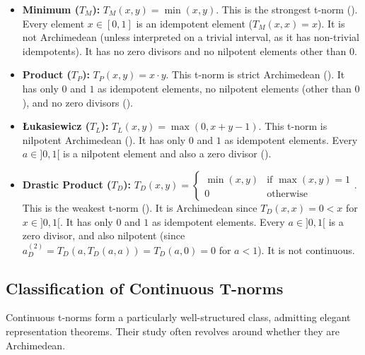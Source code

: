 \begin{example}
  \begin{itemize}
    \item \textbf{Minimum ($T_M$):} $T_M(x, y) = \min(x, y)$.
    This is the strongest t-norm (\cite[Rem.~1.5(i)]{Klement2000}). Every element $x \in [0,1]$ is an idempotent element ($T_M(x,x)=x$). It is not Archimedean (unless interpreted on a trivial interval, as it has non-trivial idempotents). It has no zero divisors and no nilpotent elements other than 0.
    \item \textbf{Product ($T_P$):} $T_P(x, y) = x \cdot y$.
    This t-norm is strict Archimedean (\cite[Ex.~2.14(i)]{Klement2000}). It has only $0$ and $1$ as idempotent elements, no nilpotent elements (other than $0$), and no zero divisors (\cite[Ex.~2.2(i)]{Klement2000}).
    \item \textbf{Łukasiewicz ($T_L$):} $T_L(x, y) = \max(0, x + y - 1)$.
    This t-norm is nilpotent Archimedean (\cite[Ex.~2.14(i)]{Klement2000}). It has only $0$ and $1$ as idempotent elements. Every $a \in ]0,1[$ is a nilpotent element and also a zero divisor (\cite[Ex.~2.2(i)]{Klement2000}).
    \item \textbf{Drastic Product ($T_D$):} $T_D(x, y) = \begin{cases} \min(x,y) & \text{if } \max(x,y)=1 \\ 0 & \text{otherwise} \end{cases}$.
    This is the weakest t-norm (\cite[Rem.~1.5(i)]{Klement2000}). It is Archimedean since $T_D(x,x)=0 < x$ for $x \in ]0,1[$. It has only $0$ and $1$ as idempotent elements. Every $a \in ]0,1[$ is a zero divisor, and also nilpotent (since $a_D^{(2)} = T_D(a, T_D(a,a)) = T_D(a,0) = 0$ for $a<1$). It is not continuous.
  \end{itemize}
\end{example}

\subsection{Classification of Continuous T-norms}

Continuous t-norms form a particularly well-structured class, admitting elegant representation theorems. Their study often revolves around whether they are Archimedean.

